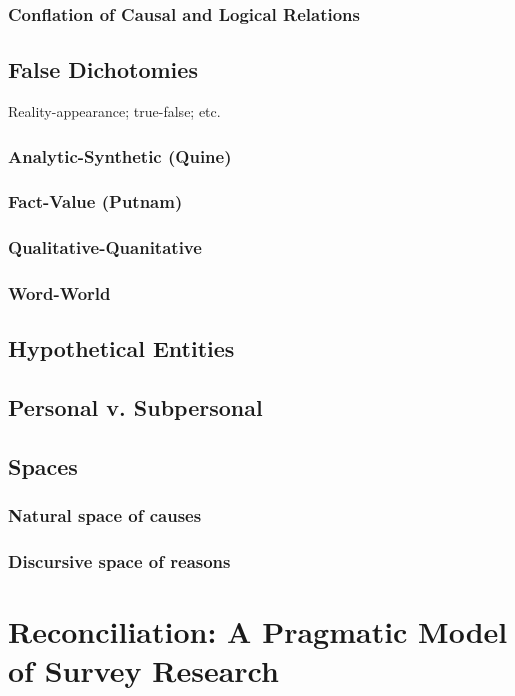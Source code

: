 \documentclass[11pt,twoside]{article}
\begin{document}
\subsubsection{Conflation of Causal and Logical Relations}


\subsection{False Dichotomies}

Reality-appearance; true-false; etc.

\subsubsection{Analytic-Synthetic (Quine)}
\subsubsection{Fact-Value (Putnam)}
\subsubsection{Qualitative-Quanitative}
\subsubsection{Word-World}

\subsection{Hypothetical Entities}

\subsection{Personal v. Subpersonal}


\subsection{Spaces}

\subsubsection{Natural space of causes}

\subsubsection{Discursive space of reasons}

\section{Reconciliation: A Pragmatic Model of Survey Research}
\end{document}

